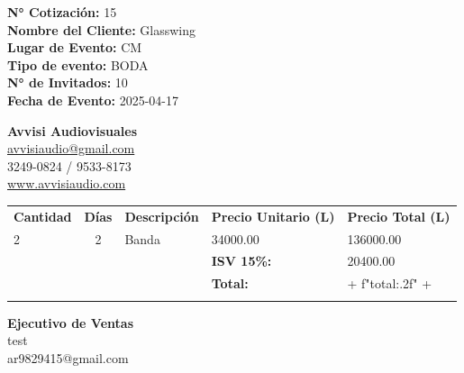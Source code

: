 \documentclass[a4paper,12pt]{article}
\begin{document}
\vspace*{1.5cm}
\noindent

\noindent
\textbf{N° Cotización:} 15 \\
\textbf{Nombre del Cliente:} Glasswing\\
\textbf{Lugar de Evento:} CM \\
\textbf{Tipo de evento:} BODA \\
\textbf{N° de Invitados:} 10\\
\textbf{Fecha de Evento:} 2025{-}04{-}17
\begin{flushright}
\vspace{-3.5cm}
\textbf{Avvisi Audiovisuales}\\
\href{mailto:avvisiaudio@gmail.com}{avvisiaudio@gmail.com} \\
3249-0824 / 9533-8173 \\
\href{https://avvisiaudio.com}{www.avvisiaudio.com} 
\end{flushright}
\vspace{1cm}


\noindent 
\begin{table}[h!]
    \centering
    \renewcommand{\arraystretch}{1.3} %
    \begin{tabularx}{\textwidth}{
            l
            c
            X
            l
            l
        }
        \arrayrulecolor{primary}\hline
        \textbf{Cantidad} & \textbf{Días} & \textbf{Descripción} & \textbf{Precio Unitario (L)} & \textbf{Precio Total (L)} \\
        \arrayrulecolor{primary}\hline \hline

        2 & 2 & {\raggedright\arraybackslash Banda  } & 34000.00 & 136000.00 \\
    
        \arrayrulecolor{primary}\hline
        & & & \textbf{ISV 15\%:} & 20400.00 \\
        & & & \textbf{Total:} & + f"{total:.2f}" +  \\
        \arrayrulecolor{primary}
    \end{tabularx}
    \label{tab-productos-cotizados}
\end{table}

\vspace{0.4cm}
\noindent\begin{minipage}[t]{0.6\textwidth}
    \textbf{Ejecutivo de Ventas} \\
    \textbf{} test\\
    \textbf{} ar9829415@gmail.com\\
\end{minipage}%
\end{document}
